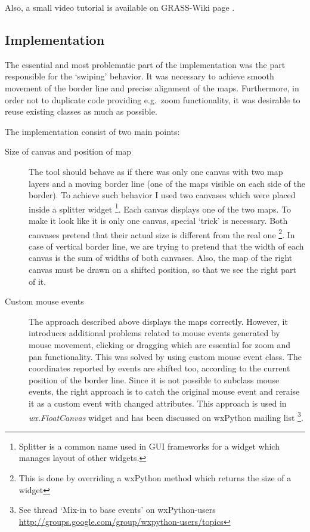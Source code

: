 \documentclass[a4paper,12pt,oneside]{book}
\begin{document}
Also, a small video tutorial is available on GRASS-Wiki page \cite{mapswipeWiki}.

\subsection{Implementation}
The essential and most problematic part of the implementation was the part responsible
for the `swiping' behavior. It was necessary to achieve smooth movement of the border line
and precise alignment of the maps. Furthermore, in order not to duplicate code providing
e.g.\ zoom functionality, it was desirable to reuse existing classes as much as possible.

The implementation consist of two main points:
    \begin{description}
      \item [Size of canvas and position of map] The tool should behave as if there was only one canvas with two map layers
      and a moving border line (one of the maps visible on each side of the border).
      To achieve such behavior I used two canvases which were placed inside a splitter widget%
      \footnote{Splitter is a common name used in GUI frameworks for a widget which manages layout of other widgets.}.
      Each canvas displays one of the two maps. To make it look like it is only one canvas,
      special `trick' is necessary. Both canvases pretend that their actual size is different from the real one%
      \footnote{This is done by overriding a wxPython method which returns the size of a widget}.
      In case of vertical border line, we are trying to pretend
      that the width of each canvas is the sum of widths of both canvases.
      Also, the map of the right canvas must be drawn on a shifted position, so that we see the right part of it.
      
      \item [Custom mouse events] The approach described above displays the maps correctly.
      However, it introduces additional problems related to mouse events generated by mouse movement,
      clicking or dragging which are essential for zoom and pan functionality.
      This was solved by using custom mouse event class. The coordinates reported by events are shifted too,
      according to the current position of the border line. Since it is not possible to subclass mouse events,
      the right approach is to catch the original mouse event and reraise it as a custom event with changed attributes.
      This approach is used in \emph{wx.FloatCanvas} widget and has been discussed on wxPython mailing list%
      \footnote{See thread `Mix-in to base events' on wxPython-users \url{http://groups.google.com/group/wxpython-users/topics}}.
    \end{description}
\end{document}
